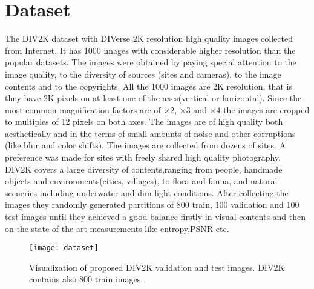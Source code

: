 \section{Dataset}
The DIV2K dataset with DIVerse 2K resolution high quality images collected from Internet. It has 1000 images with considerable higher resolution than the popular datasets. The images were obtained by paying special attention to the image quality,
to the diversity of sources (sites and cameras), to the image
contents and to the copyrights. All the 1000 images are 2K resolution, that is they have 2K pixels on at least one of the axes(vertical or horizontal). Since the most common
magnification factors are of $×2$, $×3$ and $×4$ the images are cropped to multiples of 12 pixels on both axes. The images are of high quality both aesthetically and in the terms of small amounts of noise and other corruptions (like blur and color shifts). The images are collected from dozens of sites. A preference was made for sites with freely shared high
quality photography. DIV2K covers a large diversity of contents,ranging from people, handmade objects and environments(cities, villages), to flora and fauna, and natural sceneries including underwater and dim light conditions. After collecting the images they randomly generated partitions of 800 train, 100 validation and 100 test images until they achieved a good balance firstly in visual contents and then on the state of the art measurements like entropy,PSNR etc.
\begin{figure}[h]
\texttt{[image: dataset]}
\caption{Visualization of proposed DIV2K validation and test images. DIV2K contains also 800 train images.}
\end{figure}